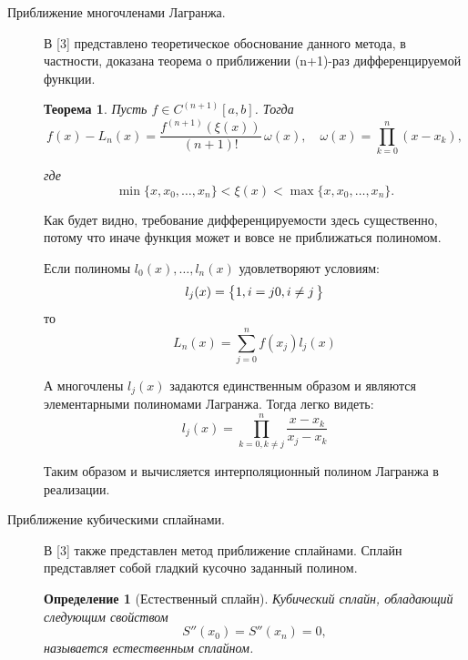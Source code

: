 \documentclass{article}
\newtheorem{theorem}{Теорема}
\newtheorem{definition}{Определение}[section]
\begin{document}
\begin{description}
    \item[Приближение многочленами Лагранжа.]

    В [3] представлено теоретическое обоснование данного метода, в частности, доказана теорема о приближении (n+1)-раз дифференцируемой функции.

    \begin{theorem}
        Пусть \(f \in C^{(n+1)}[a,b]\). Тогда
        \begin{equation}
            f(x) - L_n(x) = \frac{f^{(n+1)}(\xi(x))}{(n+1)!} \, \omega(x), \quad \omega(x) = \prod_{k=0}^{n} (x - x_k),
            \label{eq:lagrange_error}
        \end{equation}

        где
        \begin{equation}
            \min\{x, x_0, \ldots, x_n\} < \xi(x) < \max\{x, x_0, \ldots, x_n\}.
            \label{eq:placeholder}
        \end{equation}
    \end{theorem}

    Как будет видно, требование дифференцируемости здесь существенно, потому что иначе функция может и вовсе не приближаться полиномом.
    
    Если полиномы \(l_0(x), \dots, l_n(x)\) удовлетворяют условиям:
    \begin{equation}
    	l_j(x) = \left\{
    			\begin{array}{@{}l@{\thinspace}l}
    				1, i = j
    				0, i \neq j
    			\end{array}
    	\right\}
    \end{equation}
    то
    \begin{equation}
    	L_n(x) = \sum_{j=0}^{n}f(x_j)l_j(x)
    \end{equation}
    
    А многочлены \(l_j(x)\) задаются единственным образом и являются элементарными полиномами Лагранжа. Тогда легко видеть:
    \begin{equation}
    		l_j(x) = \prod_{k=0, k \neq j}^{n}\frac{x - x_k}{x_j - x_k}
	\end{equation}
	
	Таким образом и вычисляется интерполяционный полином Лагранжа в реализации.

    \item[Приближение кубическими сплайнами.]

    В [3] также представлен метод приближение сплайнами. Сплайн представляет собой гладкий кусочно заданный полином.
    \begin{definition}[Естественный сплайн]
        Кубический сплайн, обладающий следующим свойством
        \begin{equation}
            S''(x_0) = S''(x_n) = 0,
            \label{eq:placeholder_label}
        \end{equation}
        называется естественным сплайном.
    \end{definition}    


\end{description}
\end{document}
